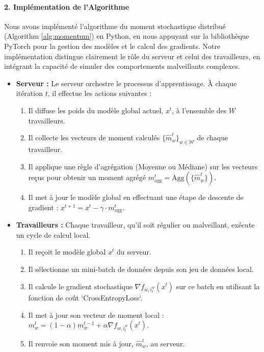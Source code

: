 \documentclass{article}
\begin{document}
\paragraph{2. Implémentation de l'Algorithme}
Nous avons implémenté l'algorithme du moment stochastique distribué (Algorithm \ref{alg:momentum}) en Python, en nous appuyant sur la bibliothèque PyTorch pour la gestion des modèles et le calcul des gradients. Notre implémentation distingue clairement le rôle du serveur et celui des travailleurs, en intégrant la capacité de simuler des comportements malveillants complexes.
\begin{itemize}
    \item \textbf{Serveur :} Le serveur orchestre le processus d'apprentissage. À chaque itération $t$, il effectue les actions suivantes :
    \begin{enumerate}
        \item Il diffuse les poids du modèle global actuel, $x^t$, à l'ensemble des $W$ travailleurs.
        \item Il collecte les vecteurs de moment calculés $\{\hat{m}_w^t\}_{w \in \mathcal{W}}$ de chaque travailleur.
        \item Il applique une règle d'agrégation (Moyenne ou Médiane) sur les vecteurs reçus pour obtenir un moment agrégé $m_{\text{agg}}^t = \mathrm{Agg}(\{\hat{m}_w^t\})$.
        \item Il met à jour le modèle global en effectuant une étape de descente de gradient : $x^{t+1} = x^t - \gamma \cdot m_{\text{agg}}^t$.
    \end{enumerate}

    \item \textbf{Travailleurs :} Chaque travailleur, qu'il soit régulier ou malveillant, exécute un cycle de calcul local.
    \begin{enumerate}
        \item Il reçoit le modèle global $x^t$ du serveur.
        \item Il sélectionne un mini-batch de données depuis son jeu de données local.
        \item Il calcule le gradient stochastique $\nabla f_{w, i_t^w}(x^t)$ sur ce batch en utilisant la fonction de coût `CrossEntropyLoss`.
        \item Il met à jour son vecteur de moment local : $m_w^t = (1 - \alpha) m_w^{t-1} + \alpha \nabla f_{w,i_t^w}(x^t)$.
        \item Il renvoie son moment mis à jour, $\hat{m}_w^t$, au serveur.
    \end{enumerate}


\end{itemize}
\end{document}
